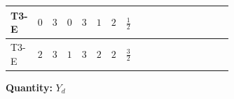 \documentclass[8pt]{article}
\begin{document}
\begin{landscape}
\begin{longtable}{@{}llcccccc >{\raggedright\arraybackslash}p{0.21\linewidth} >{\raggedright\arraybackslash}p{0.21\linewidth} >{\raggedright\arraybackslash}p{0.21\linewidth}@{}}
T3-E & $0$ & $3$ & $0$ & $3$ & $1$ & $2$ & $\frac{1}{2}$ & \scriptsize\adjustbox{max width=\linewidth}{$\begin{gathered} +\frac{3}{2} (\left({Y_d}\,\left({Y_d}\right)^{\dagger}\,{Y_d}\right)_{ij}-\left({Y_u}\,\left({Y_u}\right)^{\dagger}\,{Y_d}\right)_{ij})\end{gathered}$} & \scriptsize\adjustbox{max width=\linewidth}{$\begin{gathered} -\frac{9}{4} {g_2}^2 \left({Y_d}\right)_{ij}\end{gathered}$} & \scriptsize\adjustbox{max width=\linewidth}{$\begin{gathered} -8 {g_3}^2 \left({Y_d}\right)_{ij}\end{gathered}$} \\
\midrule
T3-E & $2$ & $3$ & $1$ & $3$ & $2$ & $2$ & $\frac{3}{2}$ & \scriptsize\adjustbox{max width=\linewidth}{$\begin{gathered} +\frac{3}{2} (\left({Y_d}\,\left({Y_d}\right)^{\dagger}\,{Y_d}\right)_{ij}-\left({Y_u}\,\left({Y_u}\right)^{\dagger}\,{Y_d}\right)_{ij})\end{gathered}$} & \scriptsize\adjustbox{max width=\linewidth}{$\begin{gathered} -\frac{9}{4} {g_2}^2 \left({Y_d}\right)_{ij}\end{gathered}$} & \scriptsize\adjustbox{max width=\linewidth}{$\begin{gathered} -8 {g_3}^2 \left({Y_d}\right)_{ij}\end{gathered}$} \\
\midrule
\bottomrule
\end{longtable}
\clearpage
\noindent\textbf{Quantity: }$Y_d$\par\smallskip

\end{landscape}
\end{document}
